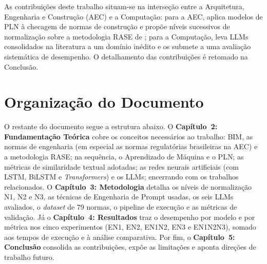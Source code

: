 As contribuições deste trabalho situam-se na interseção entre a Arquitetura, Engenharia e Construção (AEC) e a Computação: para a AEC, aplica modelos de PLN à checagem de normas de construção e propõe níveis sucessivos de normalização sobre a metodologia RASE de ; para a Computação, leva LLMs consolidados na literatura a um domínio inédito e os submete a uma avaliação sistemática de desempenho. O detalhamento das contribuições é retomado na Conclusão.


\section{Organização do Documento}

O restante do documento segue a estrutura abaixo. O \textbf{Capítulo~2: Fundamentação Teórica} cobre os conceitos necessários ao trabalho: BIM, as normas de engenharia (em especial as normas regulatórias brasileiras na AEC) e a metodologia RASE; na sequência, o Aprendizado de Máquina e o PLN; as métricas de similaridade textual adotadas; as redes neurais artificiais (com LSTM, BiLSTM e \textit{Transformers}) e os LLMs; encerrando com os trabalhos relacionados. O \textbf{Capítulo~3: Metodologia} detalha os níveis de normalização N1, N2 e N3, as técnicas de Engenharia de Prompt usadas, os seis LLMs avaliados, o \textit{dataset} de 79 normas, o pipeline de execução e as métricas de validação. Já o \textbf{Capítulo~4: Resultados} traz o desempenho por modelo e por métrica nos cinco experimentos (EN1, EN2, EN1N2, EN3 e EN1N2N3), somado aos tempos de execução e à análise comparativa. Por fim, o \textbf{Capítulo~5: Conclusão} consolida as contribuições, expõe as limitações e aponta direções de trabalho futuro.